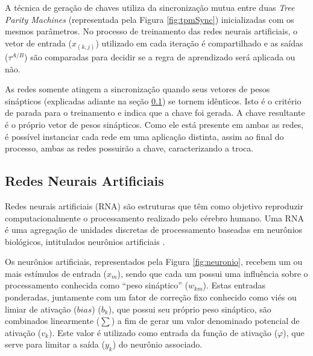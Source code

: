 \documentclass[a4paper,10pt,oneside,conference,final,keeplastbox]{inatel}
\begin{document}
            A técnica de geração de chaves utiliza da sincronização mutua entre duas \textit{Tree Parity Machines} (representada pela Figura \ref{fig:tpmSync}) inicializadas com os mesmos parâmetros. No processo de treinamento das redes neurais artificiais, o vetor de entrada ($x_{(k,j)}$) utilizado em cada iteração é compartilhado e as saídas ($\tau^{A/B}$) são comparadas para decidir se a regra de aprendizado será aplicada ou não.
            
            
            
            As redes somente atingem a sincronização quando seus vetores de pesos sinápticos (explicadas adiante na seção \ref{subsec:redes_neurais}) se tornem idênticos. Isto é o critério de parada para o treinamento e indica que a chave foi gerada. A chave resultante é o próprio vetor de pesos sinápticos. Como ele está presente em ambas as redes, é possível instanciar cada rede em uma aplicação distinta, assim ao final do processo, ambas as redes possuirão a chave, caracterizando a troca.
            
        \subsection{Redes Neurais Artificiais}
        \label{subsec:redes_neurais}
        
            Redes neurais artificiais (RNA) são estruturas que têm como objetivo reproduzir computacionalmente o processamento realizado pelo cérebro humano. Uma RNA é uma agregação de unidades discretas de processamento baseadas em neurônios biológicos, intitulados neurônios artificiais \cite{aragao2018antispam}.
            
            
            
            Os neurônios artificiais, representados pela Figura \ref{fig:neuronio}, recebem um ou mais estímulos de entrada ($x_m$), sendo que cada um possui uma influência sobre o processamento conhecida como ``peso sináptico'' ($w_{km}$). Estas entradas ponderadas, juntamente com um fator de correção fixo conhecido como viés ou limiar de ativação ($bias$) ($b_k$), que possui seu próprio peso sináptico, são combinados linearmente ($\sum$) a fim de gerar um valor denominado potencial de ativação ($v_k$). Este valor é utilizado como entrada da função de ativação ($\varphi$), que serve para limitar a saída ($y_k$) do neurônio associado.
            
\end{document}
